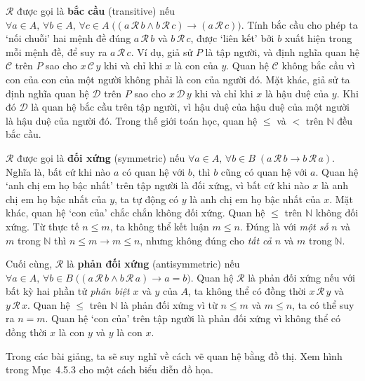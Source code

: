 $\mathcal{R}$ được gọi là \textbf{bắc cầu} (transitive) nếu $\forall a \in A,\, \forall b \in A,\, \forall c \in A\; \big((a\,\mathcal{R}\,b \wedge b\,\mathcal{R}\,c) \to (a\,\mathcal{R}\,c)\big)$. Tính bắc cầu cho phép ta `nối chuỗi' hai mệnh đề đúng $a\,\mathcal{R}\,b$ và $b\,\mathcal{R}\,c$, được `liên kết' bởi $b$ xuất hiện trong mỗi mệnh đề, để suy ra $a\,\mathcal{R}\,c$. Ví dụ, giả sử $P$ là tập người, và định nghĩa quan hệ $\mathcal{C}$ trên $P$ sao cho $x\,\mathcal{C}\,y$ khi và chỉ khi $x$ là con của $y$. Quan hệ $\mathcal{C}$ không bắc cầu vì con của con của một người không phải là con của người đó. Mặt khác, giả sử ta định nghĩa quan hệ $\mathcal{D}$ trên $P$ sao cho $x\,\mathcal{D}\,y$ khi và chỉ khi $x$ là hậu duệ của $y$. Khi đó $\mathcal{D}$ là quan hệ bắc cầu trên tập người, vì hậu duệ của hậu duệ của một người là hậu duệ của người đó. Trong thế giới toán học, quan hệ $\le$ và $<$ trên $\mathbb{N}$ đều bắc cầu.

$\mathcal{R}$ được gọi là \textbf{đối xứng} (symmetric) nếu $\forall a \in A,\, \forall b \in B\; (a\,\mathcal{R}\,b \to b\,\mathcal{R}\,a)$. Nghĩa là, bất cứ khi nào $a$ có quan hệ với $b$, thì $b$ cũng có quan hệ với $a$. Quan hệ `anh chị em họ bậc nhất' trên tập người là đối xứng, vì bất cứ khi nào $x$ là anh chị em họ bậc nhất của $y$, ta tự động có $y$ là anh chị em họ bậc nhất của $x$. Mặt khác, quan hệ `con của' chắc chắn không đối xứng. Quan hệ $\le$ trên $\mathbb{N}$ không đối xứng. Từ thực tế $n \le m$, ta không thể kết luận $m \le n$. Đúng là với \emph{một số} $n$ và $m$ trong $\mathbb{N}$ thì $n \le m \to m \le n$, nhưng không đúng cho \emph{tất cả} $n$ và $m$ trong $\mathbb{N}$.

Cuối cùng, $\mathcal{R}$ là \textbf{phản đối xứng} (antisymmetric) nếu $\forall a \in A,\, \forall b \in B\; \big((a\,\mathcal{R}\,b \wedge b\,\mathcal{R}\,a) \to a = b\big)$. Quan hệ $\mathcal{R}$ là phản đối xứng nếu với bất kỳ hai phần tử \emph{phân biệt} $x$ và $y$ của $A$, ta không thể có đồng thời $x\,\mathcal{R}\,y$ và $y\,\mathcal{R}\,x$. Quan hệ $\le$ trên $\mathbb{N}$ là phản đối xứng vì từ $n \le m$ và $m \le n$, ta có thể suy ra $n = m$. Quan hệ `con của' trên tập người là phản đối xứng vì không thể có đồng thời $x$ là con $y$ và $y$ là con $x$.

\begin{infobox}
Trong các bài giảng, ta sẽ suy nghĩ về cách vẽ quan hệ bằng đồ thị. Xem hình trong Mục~4.5.3 cho một cách biểu diễn đồ họa.
\end{infobox}


